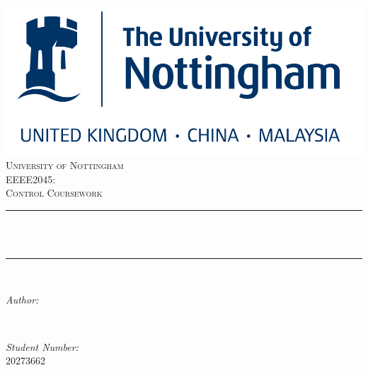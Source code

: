 \begin{titlepage}
    \centering
    \vspace*{0.5 cm}
    \includegraphics[scale = 0.4]{uon.png}\\[1.0 cm]	%
    \textsc{\LARGE University of Nottingham}\\[2.0 cm]	%
    \textsc{\Large EEEE2045:}\\[0.5 cm]				%
    \textsc{\large Control Coursework}\\[0.5 cm]				%
    \rule{\linewidth}{0.2 mm} \\[0.4 cm]
    { \huge \bfseries \thetitle}\\
    \rule{\linewidth}{0.2 mm} \\[1.5 cm]

    \begin{minipage}{0.4\textwidth}
        \begin{flushleft} \large
            \emph{Author:}\\
            \theauthor
        \end{flushleft}
    \end{minipage}~
    \begin{minipage}{0.4\textwidth}
        \begin{flushright} \large
            \emph{Student Number:} \\
            20273662									%
        \end{flushright}
    \end{minipage}\\[2 cm]

    {\large \thedate}\\[2 cm]

    \vfill

\end{titlepage}